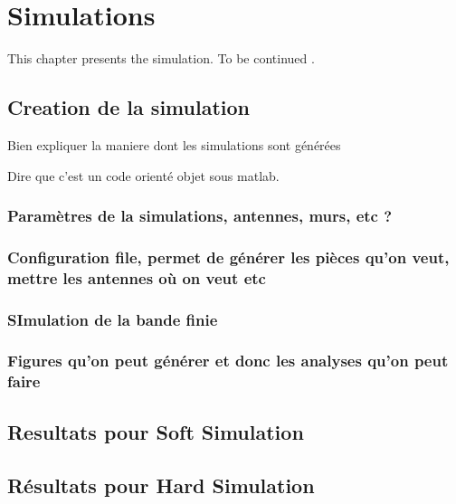 \chapter{Simulations}
\label{simulations}

This chapter presents the simulation. \color{red} To be continued \color{black}.

\section{Creation de la simulation}

Bien expliquer la maniere dont les simulations sont générées

Dire que c'est un code orienté objet sous matlab.

\subsection{Paramètres de la simulations, antennes, murs, etc ?}

\subsection{Configuration file, permet de générer les pièces qu'on veut, mettre les antennes où on veut etc}

\subsection{SImulation de la bande finie}

\subsection{Figures qu'on peut générer et donc les analyses qu'on peut faire}

\section{Resultats pour Soft Simulation}

\section{Résultats pour Hard Simulation}
